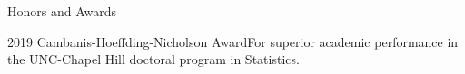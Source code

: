 \documentclass{resume_customized} %
\begin{document}
\begin{rSection}{Honors and Awards}
	
	\begin{rSubsection}{2019 Cambanis-Hoeffding-Nicholson Award}{}{For superior academic performance in the UNC-Chapel Hill doctoral program in Statistics. }{}	\end{rSubsection}
	
	
\end{rSection}
\end{document}
